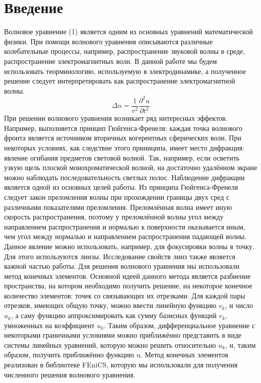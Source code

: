 \documentclass[
11pt,%
tightenlines,%
twoside,%
onecolumn,%
nofloats,%
nobibnotes,%
nofootinbib,%
superscriptaddress,%
noshowpacs,%
centertags]%
{revtex4}
\begin{document}
\section{Введение}
Волновое уравнение (1) является одним из основных уравнений математической физики. При помощи
волнового уравнения описываются различные колебательные процессы, например, 
распространение звуковой волны в среде, распространение электромагнитных волн. В данной работе
мы будем использовать теорминологию, используемую в электродинамике, а полученное решение 
следует интерпретировать как распространение электромагнитной волны. \newline
\begin{equation}
    \Delta u = \frac{1}{v^2}\frac{\partial^2u}{\partial t^2}
\end{equation}
При решении волнового уравнения возникает ряд интересных эффектов. Например, выполняется принцип
Гюйгенса-Френеля: каждая точка волнового фронта является источником вторичных
когерентных сферических волн. При некоторых условиях, как следствие этого приниципа, 
имеет место дифракция: явление огибания предметов световой волной. Так, например, если осветить
узкую щель плоской монохроматической волной, на достаточно удалённом экране можно наблюдать
последовательность светлых полос. Наблюдение дифракции является одной из основных целей
работы.\newline
Из принципа Гюйгенса-Френеля следует закон преломления волны при прохождении границы двух сред
с различными показателями преломления. Преломлённая волна имеет иную скорость распространения, поэтому
у преломлённой волны угол между направлением распространения и нормалью к поверхности оказывается
иным, чем угол между нормалью и направлением распространения падающей волны. Данное явление
можно использовать, например, для фокусировки волны в точку. Для этого используются
линзы. Исследование свойств линз также является важной частью работы. \newline
Для решения волнового уравнения мы использовали метод конечных элементов. Основной идеей данного
метода является разбиение пространства, на котором необходимо получить решение, на некоторое
конечное количество элементов: точек со связывающих их отрезками. Для каждой пары отрезков, имеющих
общую точку, можно ввести линейную функцию $v_k$, и число $u_k$, а саму функцию аппроксимировать как
сумму базисных функций $v_k$, умноженных на коэффициент $u_k$. Таким образом, дифференциальное уравнение
с некоторыми граничными условиями можно приближённо представить в виде системы линейных уравнений,
которую можно решить относительно $u_k$, и, таким образом, получить приближённо функцию u. Метод 
конечных элементов реализован в библиотеке FEniCS, которую мы использовали для получения численного
решения волнового уравнения.
\end{document}
